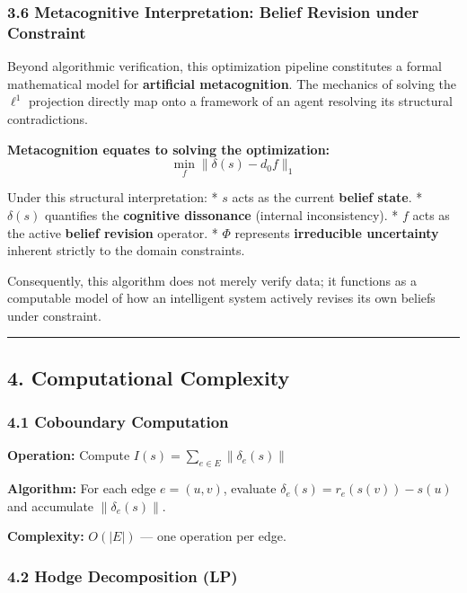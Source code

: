 \documentclass[
]{article}
\begin{document}
\subsubsection{3.6 Metacognitive Interpretation: Belief Revision under
Constraint}\label{metacognitive-interpretation-belief-revision-under-constraint}

Beyond algorithmic verification, this optimization pipeline constitutes
a formal mathematical model for \textbf{artificial metacognition}. The
mechanics of solving the \(\ell^1\) projection directly map onto a
framework of an agent resolving its structural contradictions.

\textbf{Metacognition equates to solving the optimization:}
\[ \min_f \|\delta(s) - d_0 f\|_1 \]

Under this structural interpretation: * \(s\) acts as the current
\textbf{belief state}. * \(\delta(s)\) quantifies the \textbf{cognitive
dissonance} (internal inconsistency). * \(f\) acts as the active
\textbf{belief revision} operator. * \(\Phi\) represents
\textbf{irreducible uncertainty} inherent strictly to the domain
constraints.

Consequently, this algorithm does not merely verify data; it functions
as a computable model of how an intelligent system actively revises its
own beliefs under constraint.

\begin{center}\rule{0.5\linewidth}{0.5pt}\end{center}

\subsection{4. Computational Complexity}\label{computational-complexity}

\subsubsection{4.1 Coboundary Computation}\label{coboundary-computation}

\textbf{Operation:} Compute \(I(s) = \sum_{e \in E} \|\delta_e(s)\|\)

\textbf{Algorithm:} For each edge \(e = (u, v)\), evaluate
\(\delta_e(s) = r_e(s(v)) - s(u)\) and accumulate \(\|\delta_e(s)\|\).

\textbf{Complexity:} \(O(|E|)\) --- one operation per edge.

\subsubsection{4.2 Hodge Decomposition
(LP)}\label{hodge-decomposition-lp}
\end{document}
